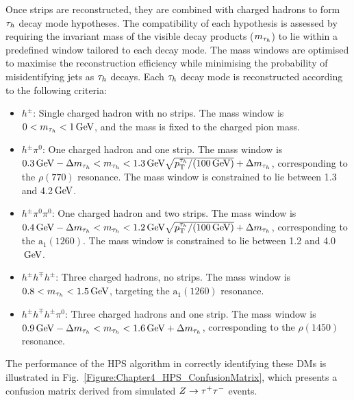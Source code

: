 Once strips are reconstructed, they are combined with charged hadrons to form $\tau_h$ decay mode hypotheses. The compatibility of each hypothesis is assessed by requiring the invariant mass of the visible decay products ($m_{\tau_h}$) to lie within a predefined window tailored to each decay mode. The mass windows are optimised to maximise the reconstruction efficiency while minimising the probability of misidentifying jets as $\tau_h$ decays. Each $\tau_h$ decay mode is reconstructed according to the following criteria:

\begin{itemize}
    \item \textbf{$h^\pm$}: Single charged hadron with no strips. The mass window is $0 < m_{\tau_h} < 1\,\text{Ge\hspace{-.08em}V}$, and the mass is fixed to the charged pion mass.
    \item \textbf{$h^\pm \pi^0$}: One charged hadron and one strip. The mass window is $0.3\,\text{Ge\hspace{-.08em}V} - \Delta m_{\tau_h} < m_{\tau_h} < 1.3\,\text{Ge\hspace{-.08em}V}\sqrt{p_\mathrm{T}^{\tau_h}/(100\,\text{Ge\hspace{-.08em}V})} + \Delta m_{\tau_h}$, corresponding to the $\rho(770)$ resonance. The mass window is constrained to lie between 1.3 and 4.2$\,\text{Ge\hspace{-.08em}V}$.
    \item \textbf{$h^\pm \pi^0 \pi^0$}: One charged hadron and two strips. The mass window is $0.4\,\text{Ge\hspace{-.08em}V} - \Delta m_{\tau_h} < m_{\tau_h} < 1.2\,\text{Ge\hspace{-.08em}V}\sqrt{p_\mathrm{T}^{\tau_h}/(100\,\text{Ge\hspace{-.08em}V})} + \Delta m_{\tau_h}$, corresponding to the $\mathrm{a}_1(1260)$. The mass window is constrained to lie between 1.2 and 4.0$\,\text{Ge\hspace{-.08em}V}$.
    \item \textbf{$h^\pm h^\mp h^\pm$}: Three charged hadrons, no strips. The mass window is $0.8 < m_{\tau_h} < 1.5\,\text{Ge\hspace{-.08em}V}$, targeting the $\mathrm{a}_1(1260)$ resonance.
    \item \textbf{$h^\pm h^\mp h^\pm \pi^0$}: Three charged hadrons and one strip. The mass window is $0.9\,\text{Ge\hspace{-.08em}V} - \Delta m_{\tau_h}< m_{\tau_h} < 1.6\,\text{Ge\hspace{-.08em}V} + \Delta m_{\tau_h}$, corresponding to the $\rho(1450)$ resonance.
\end{itemize}

The performance of the \ac{HPS} algorithm in correctly identifying these \acp{DM} is illustrated in Fig.~\ref{Figure:Chapter4_HPS_ConfusionMatrix}, which presents a confusion matrix derived from simulated $Z \rightarrow \tau^+ \tau^-$ events. 


